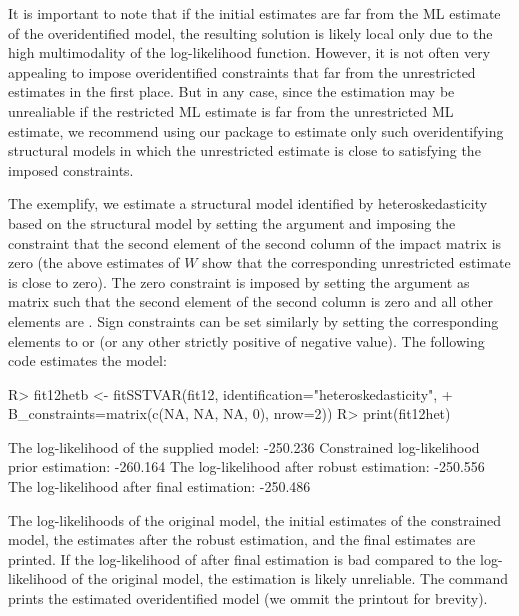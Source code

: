 \documentclass[nojss]{jss}
\begin{document}
It is important to note that if the initial estimates are far from the ML estimate of the overidentified model, the resulting solution is likely local only due to the high multimodality of the log-likelihood function. However, it is not often very appealing to impose overidentified constraints that far from the unrestricted estimates in the first place. But in any case, since the estimation may be unrealiable if the restricted ML estimate is far from the unrestricted ML estimate, we recommend using our package to estimate only such overidentifying structural models in which the unrestricted estimate is close to satisfying the imposed constraints.

The exemplify, we estimate a structural model identified by heteroskedasticity based on the structural model  by setting the argument  and imposing the constraint that the second element of the second column of the impact matrix is zero (the above estimates of $W$ show that the corresponding unrestricted estimate is close to zero). The zero constraint is imposed by setting the argument  as matrix such that the second element of the second column is zero and all other elements are . Sign constraints can be set similarly by setting the corresponding elements to  or  (or any other strictly positive of negative value). The following code estimates the model:
\begin{CodeChunk}
\begin{CodeInput}
R> fit12hetb <- fitSSTVAR(fit12, identification="heteroskedasticity",
+    B_constraints=matrix(c(NA, NA, NA, 0), nrow=2))
R> print(fit12het)
\end{CodeInput}
\begin{CodeOutput}
The log-likelihood of the supplied model:    -250.236
Constrained log-likelihood prior estimation: -260.164
The log-likelihood after robust estimation:  -250.556
The log-likelihood after final estimation:   -250.486
\end{CodeOutput}
\end{CodeChunk}
The log-likelihoods of the original model, the initial estimates of the constrained model, the estimates after the robust estimation, and the final estimates are printed. If the log-likelihood of after final estimation is bad compared to the log-likelihood of the original model, the estimation is likely unreliable. The command  prints the estimated overidentified model (we ommit the printout for brevity).
\end{document}
